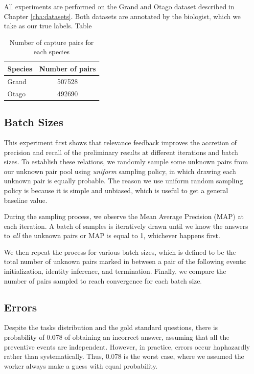 All experiments are performed on the Grand and Otago dataset described in
Chapter \ref{cha:datasets}. Both datasets are annotated by the biologist, which
we take as our true labels. Table 

\begin{table}[t]
\captionsetup{justification=centering}
  \caption{Number of capture pairs for each species}
  \label{species-num-pairs}
  \centering
  \begin{tabular}{lc}
    \toprule
    Species & Number of pairs \\
    \midrule
    Grand & 507528 \\
    Otago & 492690 \\
    \bottomrule
  \end{tabular}
\end{table}

\subsection{Batch Sizes} %
\label{sub:batch_sizes}

This experiment first shows that relevance feedback improves the accretion of
precision and recall of the preliminary results at different iterations and
batch sizes. To establish these relations, we randomly sample some unknown
pairs from our unknown pair pool using \emph{uniform} sampling policy, in which
drawing each unknown pair is equally probable. The reason we use uniform random
sampling policy is because it is simple and unbiased, which is useful to get a
general baseline value.

During the sampling process, we observe the Mean Average Precision (MAP) at
each iteration. A batch of samples is iteratively drawn until we know the
answers to \emph{all} the unknown pairs or MAP is equal to 1, whichever happens
first.

We then repeat the process for various batch sizes, which is defined to be the
total number of unknown pairs marked in between a pair of the following events:
initialization, identity inference, and termination. Finally, we compare the
number of pairs sampled to reach convergence for each batch size.

\subsection{Errors} %
\label{sub:errors}

Despite the tasks distribution and the gold standard questions, there is
probability of 0.078 of obtaining an incorrect answer, assuming that all the
preventive events are independent. However, in practice, errors occur
haphazardly rather than systematically. Thus, 0.078 is the worst case, where we
assumed the worker always make a guess with equal probability.

